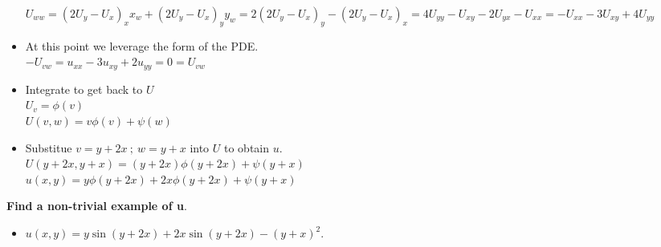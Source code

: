 \documentclass[10pt]{article}
\begin{document}
\begin{itemize}
    \subitem $ \displaystyle U_{ww} = (2U_{y} - U_{x})_{x}x_{w} + (2U_{y} - U_{x})_{y}y_{w} = 2(2U_{y} - U_{x})_{y} - (2U_{y} - U_{x})_{x} = 4U_{yy} - U_{xy} - 2U_{yx} - U_{xx} = - U_{xx} - 3U_{xy} + 4U_{yy} $ \\
    \item At this point we leverage the form of the PDE. \\
    \subitem $ \displaystyle -U_{vw} = u_{xx} - 3u_{xy} + 2u_{yy} = 0 = U_{vw}$ \\
    \item Integrate to get back to $ U $ \\
    \subitem $ \displaystyle U_{v} = \phi(v) $ \\
    \subitem $ \displaystyle U(v,w) = v\phi(v) + \psi(w) $ \\
    \item Substitue $ \displaystyle v = y + 2x \ ; \ w = y + x $ into $\displaystyle U $ to obtain $ \displaystyle u $. \\
    \subitem $ \displaystyle U(y+2x,y+x) = (y+2x)\phi(y+2x) + \psi(y+x) $ \\
    \subitem $ \displaystyle u(x,y) = y\phi(y+2x) + 2x\phi(y+2x) + \psi(y+x) $ \\
\end{itemize}

\textbf{Find a non-trivial example of u}. \\
\begin{itemize}
    \item $ \displaystyle u(x,y) = y\sin{(y+2x)} + 2x\sin{(y+2x)} - (y+x)^2 $. \\
\end{itemize}
\end{document}
